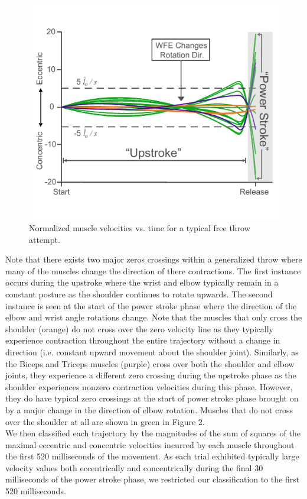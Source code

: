 \documentclass[12pt]{article}
\begin{document}
\begin{multicols}{2}
\begin{figure}[H]
\centering
\includegraphics{images/NormalizedMuscleVelocitiesExample}
\caption{Normalized muscle velocities vs. time for a typical free throw attempt.}\label{Figure2}
\end{figure}
\noindent Note that there exists two major zeros crossings within a generalized throw where many of the muscles change the direction of there contractions. The first instance occurs during the upstroke where the wrist and elbow typically remain in a constant posture as the shoulder continues to rotate upwards. The second instance is seen at the start of the power stroke phase where the direction of the elbow and wrist angle rotations change. Note that the muscles that only cross the shoulder (orange) do not cross over the zero velocity line as they typically experience contraction throughout the entire trajectory without a change in direction (i.e. constant upward movement about the shoulder joint). Similarly, as the Biceps and Triceps muscles (purple) cross over both the shoulder and elbow joints, they experience a different zero crossing during the upstroke phase as the shoulder experiences nonzero contraction velocities during this phase. However, they do have typical zero crossings at the start of power stroke phase brought on by a major change in the direction of elbow rotation. Muscles that do not cross over the shoulder at all are shown in green in Figure 2.\\ 
We then classified each trajectory by the magnitudes of the sum of squares of the maximal eccentric and concentric velocities incurred by each muscle throughout the first 520 milliseconds of the movement. As each trial exhibited typically large velocity values both eccentrically and concentrically during the final 30 milliseconds of the power stroke phase, we restricted our classification to the first 520 milliseconds.  

\end{multicols}
\end{document}
